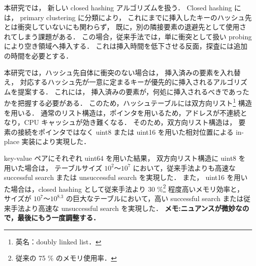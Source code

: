 
本研究では，
新しい closed hashing アルゴリズムを扱う．
Closed hashing には，
primary clustering に分類により，
これにまでに挿入したキーのハッシュ先とは衝突していないにも関わらず，
既に，別の隣接要素の退避先として使用されてしまう課題がある．
この場合，従来手法では，単に衝突として扱い probing により空き領域へ挿入する．
これは挿入時間を低下させる反面，探査には追加の時間を必要とする．

本研究では，ハッシュ先自体に衝突のない場合は，
挿入済みの要素を入れ替え，
対応するハッシュ先が一意に定まるキーが優先的に挿入されるアルゴリズムを提案する．
これには，
挿入済みの要素が，何処に挿入されるべきであったかを把握する必要がある．
このため，ハッシュテーブルには双方向リスト\footnote{英名：doubly linked list．} 構造を用いる．
通常のリスト構造は，ポインタを用いるため，アドレスが不連続となり，CPU キャッシュが効き難くなる．
そのため，双方向リスト構造は，
要素の接続をポインタではなく uint8 または uint16 を用いた相対位置による in-place 実装により実現した．

key-value ペアにそれぞれ uint64 を用いた結果，
双方向リスト構造に uint8 を用いた場合は，
テーブルサイズ $10^2〜10^{7}$ において，従来手法よりも高速な successful search または unsuccessful search を実現した．
また，
uint16 を用いた場合は，closed hashing として従来手法より 30 \%\footnote{従来の 75 \% のメモリ使用率．} 程度高いメモリ効率と，
サイズが $10^7〜10^{8.3}$ の巨大なテーブルにおいて，高い successful search または従来手法より高速な unsuccessful search を実現した．
{\bf \color{red}メモ:ニュアンスが微妙なので，最後にもう一度調整する．}






